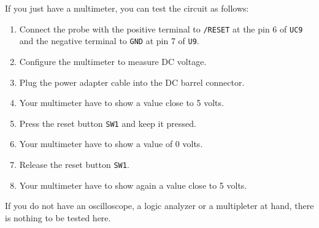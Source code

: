 If you just have a multimeter, you can test the circuit as follows:

\begin{enumerate}
  \item Connect the probe with the positive terminal to {\tt /RESET} at the pin 6 of {\tt UC9} and the negative terminal to {\tt GND} at pin 7 of {\tt U9}.
  \item Configure the multimeter to measure DC voltage.
  \item Plug the power adapter cable into the DC barrel connector.
  \item Your multimeter have to show a value close to 5 volts.
  \item Press the reset button {\tt SW1} and keep it pressed.
  \item Your multimeter have to show a value of 0 volts.
  \item Release the reset button {\tt SW1}.
  \item Your multimeter have to show again a value close to 5 volts.
\end{enumerate}

If you do not have an oscilloscope, a logic analyzer or a multipleter at hand, there is nothing to be tested here.

